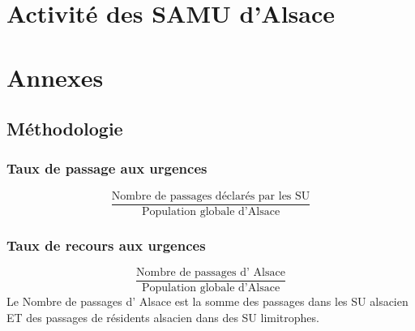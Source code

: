 \documentclass[12pt,english,french,twoside]{report}\usepackage[]{graphicx}\usepackage[]{color}
\begin{document}
\part{Activité des SAMU d'Alsace}





\part{Annexes}

\newpage
\appendix
\chapter{Méthodologie}


\section*{Taux de passage aux urgences}
  \begin{displaymath}
    \frac{\text{Nombre de passages déclarés par les SU}}{\text{Population globale d'Alsace}}
  \end{displaymath}

\section*{Taux de recours aux urgences}
\begin{displaymath}
    \frac{\text{Nombre de passages d' Alsace}}{\text{Population globale d'Alsace}}
  \end{displaymath}
Le Nombre de passages d' Alsace est la somme des passages dans les SU alsacien ET des passages de résidents alsacien dans des SU limitrophes.
\end{document}
